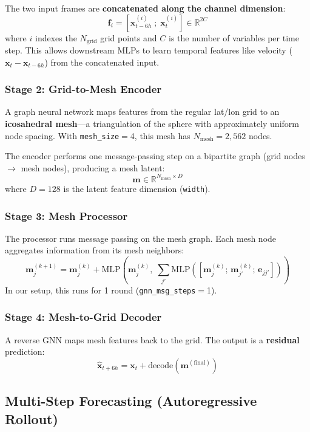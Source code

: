 \documentclass[11pt,a4paper]{article}
\begin{document}
The two input frames are \textbf{concatenated along the channel dimension}:
\[
\mathbf{f}_i = [\mathbf{x}_{t-6h}^{(i)} \;;\; \mathbf{x}_t^{(i)}] \in \mathbb{R}^{2C}
\]
where $i$ indexes the $N_\text{grid}$ grid points and $C$ is the number of variables per time step. This allows downstream MLPs to learn temporal features like velocity ($\mathbf{x}_t - \mathbf{x}_{t-6h}$) from the concatenated input.

\subsubsection{Stage 2: Grid-to-Mesh Encoder}

A graph neural network maps features from the regular lat/lon grid to an \textbf{icosahedral mesh}---a triangulation of the sphere with approximately uniform node spacing. With \texttt{mesh\_size}$=$4, this mesh has $N_\text{mesh} = 2{,}562$ nodes.

The encoder performs one message-passing step on a bipartite graph (grid nodes $\to$ mesh nodes), producing a mesh latent:
\[
\mathbf{m} \in \mathbb{R}^{N_\text{mesh} \times D}
\]
where $D = 128$ is the latent feature dimension (\texttt{width}).

\subsubsection{Stage 3: Mesh Processor}

The processor runs message passing on the mesh graph. Each mesh node aggregates information from its mesh neighbors:
\[
\mathbf{m}_j^{(k+1)} = \mathbf{m}_j^{(k)} + \text{MLP}\!\left(\mathbf{m}_j^{(k)},\; \textstyle\sum_{j'} \text{MLP}([\mathbf{m}_j^{(k)};\, \mathbf{m}_{j'}^{(k)};\, \mathbf{e}_{jj'}])\right)
\]
In our setup, this runs for 1 round (\texttt{gnn\_msg\_steps}$=$1).

\subsubsection{Stage 4: Mesh-to-Grid Decoder}

A reverse GNN maps mesh features back to the grid. The output is a \textbf{residual} prediction:
\[
\hat{\mathbf{x}}_{t+6h} = \mathbf{x}_t + \text{decode}(\mathbf{m}^{(\text{final})})
\]

\subsection{Multi-Step Forecasting (Autoregressive Rollout)}
\end{document}
